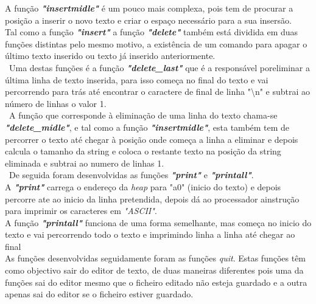 \documentclass[letterpaper,12pt]{article}
\begin{document}
A função \emph{\textbf{"insertmidle"}} é um pouco mais complexa, pois tem de procurar a posição a inserir o novo texto e criar o espaço necessário para a sua insersão.\vspace{0.5cm}\\
Tal como a função \emph{\textbf{"insert"}} a função \emph{\textbf{"delete"}} também está dividida em duas funções distintas pelo mesmo motivo, a existência de um comando para apagar o último texto inserido ou texto já inserido anteriormente.\vspace{0.3cm}\\\
Uma destas funções é a função \emph{\textbf{"delete\_last"}} que é a responsável por\newline eliminar a última linha de texto inserida,  para isso começa no final do texto e vai percorrendo para trás até encontrar o caractere de final de linha "\textbackslash n" e subtrai ao número de linhas o valor 1. \vspace{0.5cm}\\\
A função que corresponde à eliminação de uma linha do texto chama-se \emph{\textbf{"delete\_midle"}}, e tal como a função \emph{\textbf{"insertmidle"}}, esta também tem de percorrer o texto até chegar à posição onde começa a linha a eliminar e depois calcula o tamanho da string e coloca o restante  texto na posição da string eliminada e subtrai ao numero de linhas 1.\vspace{0.5cm}\\\
De seguida foram desenvolvidas as funções \emph{\textbf{"print"}} e \emph{\textbf{"printall"}}.\\
A \emph{\textbf{"print"}} carrega o endereço da \emph{heap} para "a0" (inicio do texto) e depois percorre ate ao inicio da linha pretendida, depois dá ao processador a\newline instrução para imprimir os caracteres em \emph{"ASCII"}.\vspace{0.5cm}\\
A função \emph{\textbf{"printall"}} funciona de uma forma semelhante, mas começa no inicio do texto e vai percorrendo todo o texto e imprimindo linha a linha até chegar ao final\vspace{0.5cm}\\
As funções desenvolvidas seguidamente foram as funções \emph{quit}. Estas funções têm como objectivo sair do editor de texto, de duas maneiras diferentes pois uma da funções sai do editor mesmo que o ficheiro editado não esteja guardado e a outra apenas sai do editor se o ficheiro estiver guardado.\vspace{0.5cm}\\
\end{document}
